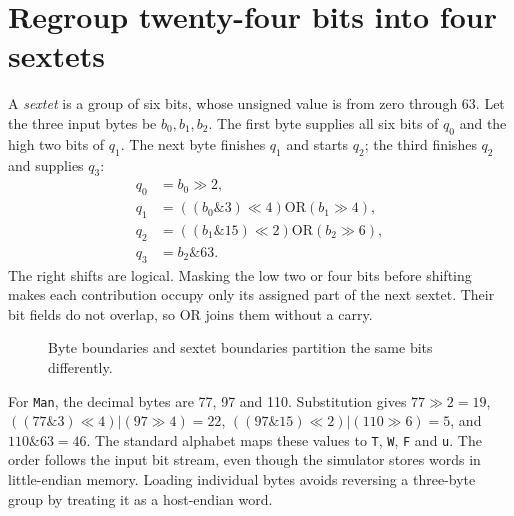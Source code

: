 \section{Regroup twenty-four bits into four sextets}
A \emph{sextet} is a group of six bits, whose unsigned value is from zero through 63.
Let the three input bytes be \(b_0,b_1,b_2\). The first byte supplies all six bits of
\(q_0\) and the high two bits of \(q_1\). The next byte finishes \(q_1\) and starts
\(q_2\); the third finishes \(q_2\) and supplies \(q_3\):
\[
  \begin{aligned}
    q_0 & =b_0\gg2,                                                 \\
    q_1 & =((b_0\mathbin{\&}3)\ll4)\mathbin{\mathrm{OR}}(b_1\gg4),  \\
    q_2 & =((b_1\mathbin{\&}15)\ll2)\mathbin{\mathrm{OR}}(b_2\gg6), \\
    q_3 & =b_2\mathbin{\&}63.
  \end{aligned}
\]
The right shifts are logical. Masking the low two or four bits before shifting makes
each contribution occupy only its assigned part of the next sextet. Their bit fields
do not overlap, so OR joins them without a carry.

\begin{figure}[htbp]
  \centering
  \caption{Byte boundaries and sextet boundaries partition the same bits differently.}\label{base64-bit-split}
\end{figure}

For \texttt{Man}, the decimal bytes are 77, 97 and 110. Substitution gives
\(77\gg2=19\), \(((77\mathbin{\&}3)\ll4)|(97\gg4)=22\),
\(((97\mathbin{\&}15)\ll2)|(110\gg6)=5\), and \(110\mathbin{\&}63=46\).
The standard alphabet maps these values to \texttt{T}, \texttt{W}, \texttt{F} and
\texttt{u}. The order follows the input bit stream, even though the simulator stores
words in little-endian memory. Loading individual bytes avoids reversing a three-byte
group by treating it as a host-endian word.
